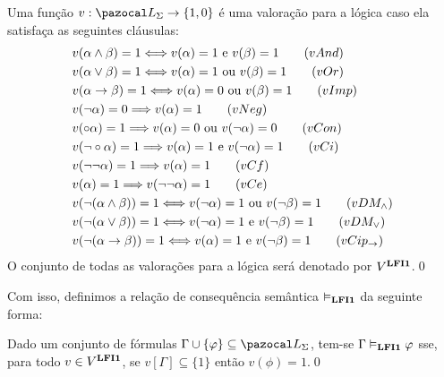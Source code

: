         \begin{definicao} \label{def:valoracoes}
            Uma função $v : \ling{} \to \{1, 0\}$ é uma valoração para a lógica \lfium{} caso ela satisfaça as seguintes cláusulas:
            \begin{align*}
                & v(\alpha \land \beta) = 1 \Longleftrightarrow v(\alpha) = 1 \text{ e } v(\beta) = 1\tag{\textbf{$vAnd$}}\\
                & v(\alpha \lor \beta) = 1 \Longleftrightarrow v(\alpha) = 1 \text{ ou } v(\beta) = 1\tag{\textbf{$vOr$}}\\
                & v(\alpha \to \beta) = 1 \Longleftrightarrow v(\alpha) = 0 \text{ ou } v(\beta) = 1\tag{\textbf{$vImp$}}\\
                & v(\neg \alpha) = 0 \Longrightarrow v(\alpha) = 1\tag{\textbf{$vNeg$}}\\
                & v(\circ \alpha) = 1 \Longrightarrow v(\alpha) = 0 \text{ ou } v(\neg \alpha) = 0\tag{\textbf{$vCon$}}\\
                & v(\neg \circ \alpha) = 1 \Longrightarrow v(\alpha) = 1 \text{ e } v(\neg \alpha) = 1\tag{\textbf{$vCi$}}\\
                & v(\neg \neg \alpha) = 1 \Longrightarrow v(\alpha) = 1\tag{\textbf{$vCf$}}\\
                & v(\alpha) = 1 \Longrightarrow v(\neg \neg \alpha) = 1\tag{\textbf{$vCe$}}\\
                & v(\neg (\alpha \land \beta)) = 1 \Longleftrightarrow v(\neg \alpha) = 1 \text{ ou } v(\neg \beta) = 1\tag{\textbf{$vDM_{\land}$}}\\
                & v(\neg (\alpha \lor \beta)) = 1 \Longleftrightarrow v(\neg \alpha) = 1 \text{ e } v(\neg \beta) = 1\tag{\textbf{$vDM_{\lor}$}}\\
                & v(\neg (\alpha \to \beta)) = 1 \Longleftrightarrow v(\alpha) = 1 \text{ e } v(\neg \beta) = 1\tag{\textbf{$vCip_{\to}$}}
            \end{align*}
            O conjunto de todas as valorações para a lógica \lfium{} será denotado por $V^{{\normalfont\textbf{LFI1}}{}}$.\qed{}
        \end{definicao}

        Com isso, definimos a relação de consequência semântica $\vDash_{{\normalfont\textbf{LFI1}}{}}$ da seguinte forma:

        \begin{definicao}
            Dado um conjunto de fórmulas $\Gamma \cup \{\phi\} \subseteq \ling{}$, tem-se $\Gamma \vDash_{{\normalfont\textbf{LFI1}}{}} \varphi$ sse, para todo $v \in V^{{\normalfont\textbf{LFI1}}{}}$, se $v[\Gamma] \subseteq \{1\}$ então $v(\phi) = 1$.\qed{}
        \end{definicao}


